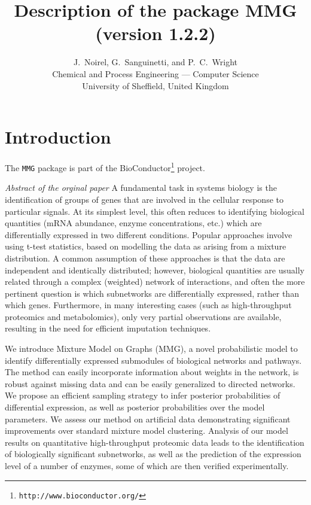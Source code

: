 \documentclass[a4paper]{article}
\author{J.\ Noirel, G.\ Sanguinetti, and P.\ C.\ Wright\\
        Chemical and Process Engineering --- Computer Science\\
        University of Sheffield, United Kingdom}
\title {Description of the package MMG\\
        (version 1.2.2)}
\newcommand*{\url}[1]{\texttt{#1}}
\newcommand*{\code}[1]{\texttt{#1}}
\begin{document}
\maketitle

\tableofcontents

\section{Introduction}

The \code{MMG} package is part of the BioConductor\footnote{\url{http://www.bioconductor.org/}} project.

\medbreak

\begin{list}{}{}
  \item[\itshape Abstract of the orginal paper]
A fundamental task in systems biology is the identification of groups of genes that are involved in the cellular response to particular signals. At its simplest level, this often reduces to identifying biological quantities (mRNA abundance, enzyme concentrations, etc.) which are differentially expressed in two different conditions. Popular approaches involve using t-test statistics, based on modelling the data as arising from a mixture distribution. A common assumption of these approaches is that the data are independent and identically distributed; however, biological quantities are usually related through a complex (weighted) network of interactions, and often the more pertinent question is which subnetworks are differentially expressed, rather than which genes. Furthermore, in many interesting cases (such as high-throughput proteomics and metabolomics), only very partial observations are available, resulting in the need for efficient imputation techniques.

We introduce Mixture Model on Graphs (MMG), a novel probabilistic model to identify differentially expressed submodules of biological networks and pathways. The method can easily incorporate information about weights in the network, is robust against missing data and can be easily generalized to directed networks. We propose an efficient sampling strategy to infer posterior probabilities of differential expression, as well as posterior probabilities over the model parameters. We assess our method on artificial data demonstrating significant improvements over standard mixture model clustering. Analysis of our model results on quantitative high-throughput proteomic data leads to the identification of biologically significant subnetworks, as well as the prediction of the expression level of a number of enzymes, some of which are then verified experimentally.
\end{list}
\end{document}

